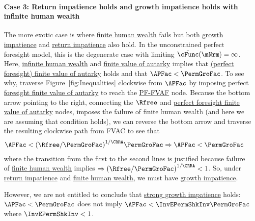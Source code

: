 \documentclass[\econtexRoot/BufferStockTheory]{subfiles}
\begin{document}
\hypertarget{PFFVAF}{}
\paragraph{Case 3: Return impatience holds and growth impatience holds with infinite human wealth} The more exotic case is where \hyperlink{FHWC}{finite human wealth} fails but both \hyperlink{GICRaw}{growth impatience} and \hyperlink{RIC}{return impatience} also hold.
In the unconstrained perfect foresight model, this is the degenerate case with limiting $\bar{\cFunc}(\mNrm)=\infty$.
Here, \hyperlink{FHWC}{infinite human wealth} and \hyperlink{FVAC}{finite value of autarky} implies that \hyperlink{PFFVAC}{(perfect foresight) finite value of autarky} holds and that $ \APFac < \PermGroFac$.
To see why, traverse Figure~\ref{fig:Inequalities} clockwise from $\APFac$ by imposing \hyperlink{PFFVAC}{perfect foresight finite value of autarky} to reach the \hyperlink{PFFVAF}{PF-FVAF}  node.
Because the bottom arrow pointing to the right, connecting the $\Rfree$ and \hyperlink{PFFVAC}{perfect foresight finite value of autarky} nodes, imposes the failure of finite human wealth (and here we are assuming that condition holds), we can reverse the bottom arrow and traverse the resulting clockwise path from {FVAC} to see that 
%
\begin{equation}\begin{gathered}\begin{aligned}
  & \APFac < {(\Rfree/\PermGroFac)}^{1/\CRRA}\PermGroFac \Rightarrow  \APFac < \PermGroFac
\end{aligned}\end{gathered}\end{equation}
%
where the transition from the first to the second lines is justified because failure of \hyperlink{FHWC}{finite human wealth} implies $\Rightarrow {(\Rfree/\PermGroFac)}^{1/\CRRA}<1$.
So, under \hyperlink{RIC}{return impatience} and \hyperlink{FHWC}{finite human wealth}, we must have \hyperlink{GICRaw}{growth impatience}.

\hypertarget{InvEPermShkEInv}{}
However, we are not entitled to conclude that \hyperlink{GICMod}{strong growth impatience} holds: $\APFac < \PermGroFac$ does not imply $\APFac < \InvEPermShkInv \PermGroFac$ where $\InvEPermShkInv<1$.
 
\end{document}
